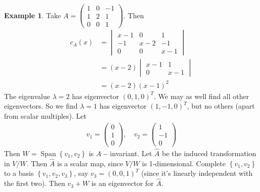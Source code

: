 \documentclass{article}
\theoremstyle{definition} \newtheorem*{definition}{Definition}
\newtheorem*{exmp}{Example} \newtheorem*{exmps}{Examples}
\DeclareMathOperator{\Span}{Span}
\begin{document}
\begin{exmp}
  Take $A = \left( 
  \begin{matrix}
    1 & 0 & -1\\
    1 & 2 & 1\\
    0 & 0 & 1
  \end{matrix}
  \right)$. Then
  \begin{align*}
    c_A(x) &= 
    \begin{vmatrix}
      x-1 & 0 & 1\\
      -1 & x-2 & -1\\
      0 & 0 & x-1
    \end{vmatrix} \\
    &=(x-2)
    \begin{vmatrix}
      x-1 & 1 \\
      0 & x-1
    \end{vmatrix}\\
    &=(x-2)(x-1)^2
  \end{align*}
  The eigenvalue $\lambda=2$ has eigenvector $(0,1,0)^T$. We may as well
  find all other eigenvectors. So we find $\lambda=1$ has eigenvector
  $(1,-1,0)^T$, but no others (apart from scalar multiples). Let
  \begin{align*}
    v_1 = \left( 
    \begin{matrix}
      0\\1\\0
    \end{matrix}
    \right),\quad v_2=\left( 
    \begin{matrix}
      1\\-1\\0
    \end{matrix}
    \right)
  \end{align*}
  Then $W=\Span\left\{ v_1,v_2 \right\}$ is $A-$invariant. Let
  $\hat{A}$ be the induced transformation in $V/W$. Then $\hat{A}$ is a
  scalar map, since $V/W$ is 1-dimensional. 
  Complete $\left\{ v_1,v_2\right\}$ to a basis  $\left\{ v_1,v_2,v_3 \right\}$, say $v_3=\left( 0,0,1 \right)^T$ (since it's linearly independent with the first two). Then $v_3+W$ is an eigenvector
  for $\hat{A}$.


\end{exmp}
\end{document}
